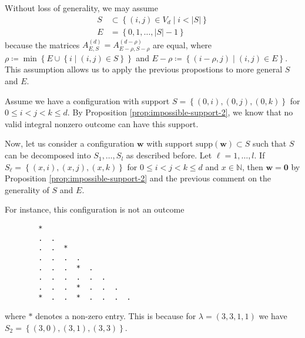 Without loss of generality, we may assume
\begin{align*}
    S &\subset \left\{ (i,j) \in V_d \mid i < \lvert S \rvert \right\}\\
    E &= \left\{ 0,1, \dots, \lvert S \rvert - 1 \right\}
\end{align*}
because the matrices \( A^{(d)}_{E,S} = A^{(d-\rho)}_{E - \rho, S - \rho} \) are equal, where \( \rho \coloneqq \min \left\{ E \cup \left\{ i \mid (i,j) \in S \right\} \right\} \) and \( E - \rho \coloneqq \left\{ (i - \rho, j) \mid (i,j) \in E \right\} \). This assumption allows us to apply the previous propostions to more general \( S \) and \( E \).

\begin{example}
    Assume we have a configuration with support \( S = \left\{ (0,i), (0,j), (0,k) \right\} \) for \( 0 \leq i < j< k \leq d \). By Proposition \ref{prop:impossible-support-2}, we know that no valid integral nonzero outcome can have this support.

    Now, let us consider a configuration \( \mathbf{w} \) with support \( \mathrm{supp}(\mathbf{w}) \subset S \) such that \( S \) can be decomposed into \( S_1, \dots, S_l \) as described before. Let \( \ell = 1, \dots, l \). If \( S_\ell = \left\{ (x,i), (x,j), (x,k) \right\} \) for \( 0 \leq i < j< k \leq d \) and \( x \in \mathbb{N} \), then \( \mathbf{w} = \mathbf 0 \) by Proposition \ref{prop:impossible-support-2} and the previous comment on the generality of \( S \) and \( E \). 

    For instance, this configuration is not an outcome
    \begin{verbatim}
        *
        .  .
        .  .  *  
        .  .  .  .  
        .  .  .  *  .  
        .  .  .  .  .  .  
        .  .  .  *  .  .  .  
        *  .  .  *  .  .  .  .  
    \end{verbatim}
    where \( * \) denotes a non-zero entry. This is because for \( \lambda = (3,3,1,1) \) we have \( S_2 = \left\{ (3,0), (3,1), (3,3) \right\} \).
\end{example}